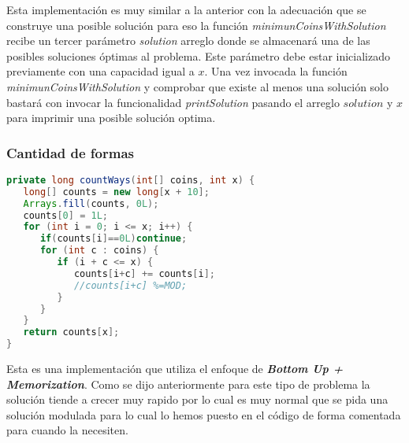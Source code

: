 Esta implementación es muy similar a la anterior con la adecuación que se construye una posible solución para eso la función \emph{minimunCoinsWithSolution} recibe un tercer parámetro \emph{solution}  arreglo donde se almacenará una de las posibles soluciones óptimas al problema. Este parámetro debe estar inicializado previamente con una capacidad igual a $x$. Una vez invocada la función \emph{minimunCoinsWithSolution} y comprobar que existe al menos una solución solo bastará con invocar la funcionalidad \emph{printSolution} pasando el arreglo $solution$ y $x$ para imprimir una posible solución optima.

\subsubsection{Cantidad de formas}

\begin{lstlisting}[language=Java]
private long countWays(int[] coins, int x) {
   long[] counts = new long[x + 10];
   Arrays.fill(counts, 0L);
   counts[0] = 1L;
   for (int i = 0; i <= x; i++) {
      if(counts[i]==0L)continue;
      for (int c : coins) {
         if (i + c <= x) {
            counts[i+c] += counts[i];
            //counts[i+c] %=MOD;
         }
      }
   }
   return counts[x];
}
\end{lstlisting}

Esta es una implementación que utiliza el enfoque de \textbf{\emph{Bottom Up + Memorization}}. Como se dijo anteriormente para este tipo de problema la solución tiende a crecer muy rapido por lo cual es muy normal que se pida una solución modulada para lo cual lo hemos puesto en el código de forma comentada para cuando la necesiten.
